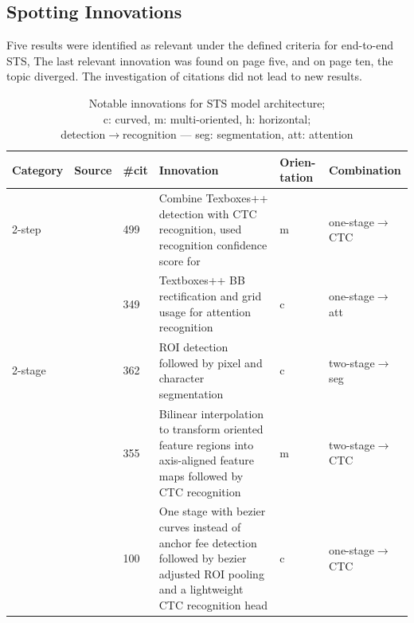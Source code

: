 \subsection{Spotting Innovations}
Five results were identified as relevant under the defined criteria for end-to-end \ac{STS},
The last relevant innovation was found on page five, and on page ten, the topic diverged.
The investigation of citations did not lead to new results.
\begin{table}[h]
    \centering\scriptsize
    \begin{tabular}{p{}p{}p{}p{}
            p{}p{}}
    \textbf{Category} & \textbf{Source} & \textbf{\#cit} & \textbf{Innovation} &
                                        \textbf{Orien-tation} & \textbf{Combination} \\
        \toprule
        2-step &~\cite{liao_textboxes_2018} & 499 & Combine Texboxes++ detection with CTC
            recognition, used recognition confidence score for & m & one-stage$\rightarrow$CTC\\
            &~\cite{shi_aster_2019} & 349 & Textboxes++ BB rectification and grid usage for
                attention recognition & c & one-stage$\rightarrow$att \\
        2-stage &~\cite{lyu_mask_2018} & 362 & ROI detection followed by pixel and character
            segmentation & c & two-stage$\rightarrow$seg \\
            &~\cite{liu_fots_2018} & 355 & Bilinear interpolation to transform oriented feature
                regions into axis-aligned feature maps followed by CTC recognition
            & m & two-stage$\rightarrow$CTC\\
            &~\cite{liu_abcnet_2020} & 100 & One stage with bezier curves instead of anchor fee
                detection followed by bezier adjusted ROI pooling and a lightweight CTC
                recognition head & c & one-stage$\rightarrow$CTC  \\
        \bottomrule
    \end{tabular}
    \captionsetup{justification=centering}
    \caption[Notable innovations for STS model architecture]{%
        Notable innovations for STS model architecture; \\
        c: curved, m: multi-oriented, h: horizontal; \\
        detection$\rightarrow$recognition --- seg: segmentation, att:
        attention\label{tb:E2E-steps-properties}
    }
\end{table}

